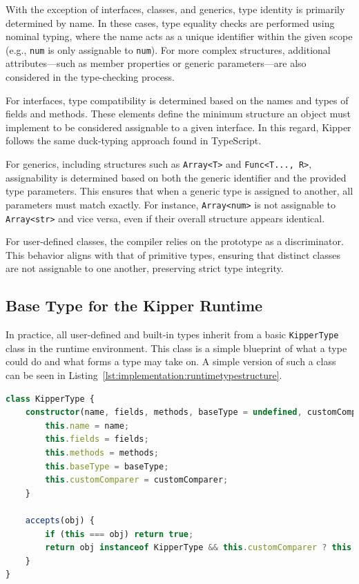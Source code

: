 With the exception of interfaces, classes, and generics, type identity is primarily determined by name. In these cases, type equality checks are performed using nominal typing, where the name acts as a unique identifier within the given scope (e.g., \lstinline|num| is only assignable to \lstinline|num|). For more complex structures, additional attributes—such as member properties or generic parameters—are also considered in the type-checking process.

For interfaces, type compatibility is determined based on the names and types of fields and methods. These elements define the minimum structure an object must implement to be considered assignable to a given interface. In this regard, Kipper follows the same duck-typing approach found in TypeScript.

For generics, including structures such as \lstinline|Array<T>| and \lstinline|Func<T..., R>|, assignability is determined based on both the generic identifier and the provided type parameters. This ensures that when a generic type is assigned to another, all parameters must match exactly. For instance, \lstinline|Array<num>| is not assignable to \lstinline|Array<str>| and vice versa, even if their overall structure appears identical.

For user-defined classes, the compiler relies on the prototype as a discriminator. This behavior aligns with that of primitive types, ensuring that distinct classes are not assignable to one another, preserving strict type integrity.

\subsection{Base Type for the Kipper Runtime}
\label{sec:basetype}

In practice, all user-defined and built-in types inherit from a basic \lstinline|KipperType| class in the runtime environment. This class is a simple blueprint of what a type could do and what forms a type may take on. A simple version of such a class can be seen in Listing~\ref{lst:implementation:runtimetypestructure}.

\begin{lstlisting}[language=TypeScript,caption=The structure of a runtime type,label=lst:implementation:runtimetypestructure]
class KipperType {
	constructor(name, fields, methods, baseType = undefined, customComparer = undefined) {
		this.name = name;
		this.fields = fields;
		this.methods = methods;
		this.baseType = baseType;
		this.customComparer = customComparer;
	}

	accepts(obj) {
		if (this === obj) return true;
		return obj instanceof KipperType && this.customComparer ? this.customComparer(this, obj) : false;
	}
}
\end{lstlisting}

